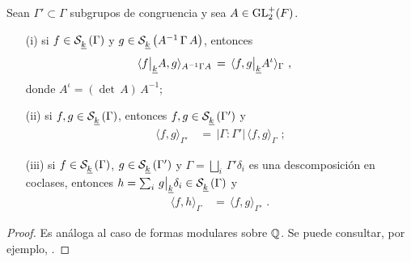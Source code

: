 \begin{propoPeterssonPropiedades}\label{propo:peterssonpropiedades}
	Sean $\Gamma'\subset\Gamma$ subgrupos de congruencia y sea
	$A\in\mathrm{GL}^{+}_{2}(F)$.
	\begin{itemize}
		\item[(i)] si $f\in\mathcal{S}^{}_{\underline{k}}\left(\Gamma\right)$ y
			$g\in\mathcal{S}^{}_{\underline{k}}\left(A^{-1}\,\Gamma\,A\right)$, entonces
			\begin{align*}
				\langle f\big|_{\underline{k}}{A},
					g\rangle_{A^{-1}\Gamma A} & \,=\,
				\langle f,g\big|_{\underline{k}}{A^\iota}
					\rangle_{\Gamma}
				\text{ ,}
			\end{align*}
			donde $A^\iota = (\det\,A)\,A^{-1}$;
		\item[(ii)] si $f,g\in\mathcal{S}^{}_{\underline{k}}\left(\Gamma\right)$, entonces
			$f,g\in\mathcal{S}^{}_{\underline{k}}\left(\Gamma'\right)$ y
			\begin{align*}
				\langle f,g\rangle_{\Gamma'} & \,=\,
				|\Gamma:\Gamma'|\,\langle f,g\rangle_{\Gamma}
				\text{ ;}
			\end{align*}
		\item[(iii)] si $f\in\mathcal{S}^{}_{\underline{k}}\left(\Gamma\right)$,
			$g\in\mathcal{S}^{}_{\underline{k}}\left(\Gamma'\right)$ y
			$\Gamma=\bigsqcup_{i}\,\Gamma'\delta_{i}$ es una
			descomposici\'{o}n en coclases, entonces
			\begin{math}
				h=\sum_{i}\,g\operadormatrices{\peso{k}}{%
						\delta_{i}}\in
					\spitzH{k}{\Gamma}
			\end{math}
			y
			\begin{align*}
				\langle f,h\rangle_{\Gamma} & \,=\,
					\langle f,g\rangle_{\Gamma'}
				\text{ .}
			\end{align*}
	\end{itemize}
\end{propoPeterssonPropiedades}

\begin{proof}
	Es an\'{a}loga al caso de formas modulares sobre $\mathbb{Q}$. Se puede
	consultar, por ejemplo, \cite[\S\S~5.4 y 5.5]{DiamondShurman}.
\end{proof}
